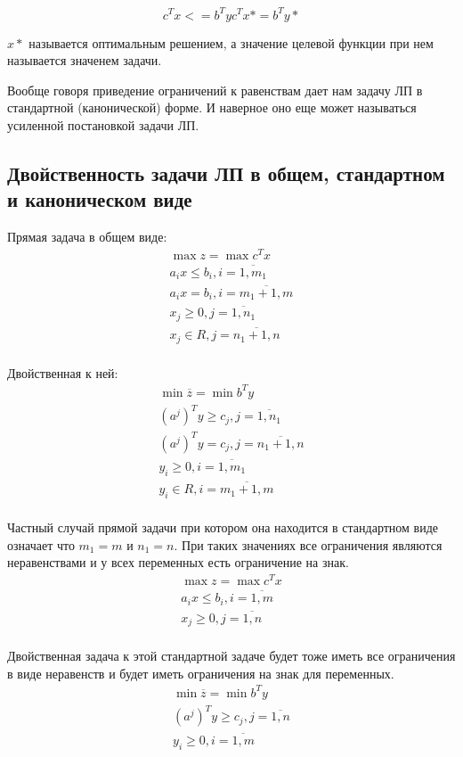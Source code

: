 \documentclass[a4paper,article,14pt]{extarticle}
\begin{document}
\[
c^T x <= b^T y

c^T x* = b^T y*
\]

\(x*\) называется оптимальным решением, а значение целевой функции при нем называется значенем задачи.

Вообще говоря приведение ограничений к равенствам дает нам задачу ЛП в стандартной (канонической) форме.
И наверное оно еще может называться усиленной постановкой задачи ЛП.

\subsection{Двойственность задачи ЛП в общем, стандартном и каноническом виде}

Прямая задача в общем виде:
\begin{gather}
    \max z = \max c^T x \\
    a_ix \le b_i, i = \overline{1, m_1} \\
    a_ix = b_i, i = \overline{m_1 + 1, m} \\
    x_j \ge 0, j = \overline{1, n_1} \\
    x_j \in R, j = \overline{n_1 + 1, n} \\
\end{gather}

Двойственная к ней:
\begin{gather}
    \min \overline z = \min b^T y \\
    (a^j)^Ty \ge c_j, j = \overline{1, n_1} \\
    (a^j)^Ty = c_j, j = \overline{n_1 + 1, n} \\
    y_i \ge 0, i = \overline{1, m_1} \\
    y_i \in R, i = \overline{m_1 + 1, m} \\
\end{gather}

Частный случай прямой задачи при котором она находится в стандартном виде означает что \(m_1 = m\) и \(n_1 = n\).
При таких значениях все ограничения являются неравенствами и у всех переменных есть ограничение на знак.
\begin{gather}
    \max z = \max c^T x \\
    a_ix \le b_i, i = \overline{1, m} \\
    x_j \ge 0, j = \overline{1, n} \\
\end{gather}

Двойственная задача к этой стандартной задаче будет тоже иметь все ограничения в виде неравенств и будет иметь ограничения на знак для переменных.
\begin{gather}
    \min \overline z = \min b^T y \\
    (a^j)^Ty \ge c_j, j = \overline{1, n} \\
    y_i \ge 0, i = \overline{1, m} \\
\end{gather}
\end{document}
